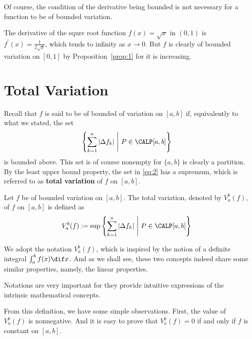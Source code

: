 \documentclass[thmcnt=section, color=blue, 12pt]{my-elegantbook}
\begin{document}
Of course, the condition of the derivative being bounded is not necessary
for a function to be of bounded variation.

\begin{example}
	The derivative of the squre root function $f(x) = \sqrt{x}$ in $(0, 1)$
	is $f^\prime(x) = \frac{1}{2\sqrt{x}}$,
	which tends to infinity as $x \to 0$.
	But $f$ is clearly of bounded variation on $[0, 1]$
	by Proposition~\ref{prop:1} for it is increasing.
\end{example}


\section{Total Variation}

Recall that $f$ is said to be of bounded of variation
on $[a, b]$ if, equivalently to what we stated, the set
\begin{align}
	\set{\sum_{k=1}^n \abs{\Delta f_k}}{P \in \CALP [a, b]}
	\label{eq:2}
\end{align}
is bounded above.
This set is of course nonempty for $\{a, b\}$ is clearly a partition.
By the least upper bound property,
the set in \eqref{eq:2} has a supremum, which is referred to as
\textbf{total variation} of $f$ on $[a, b]$.

\begin{definition}
	Let $f$ be of bounded variation on $[a, b]$.
	The total variation, denoted by $V_a^b (f)$,
	of $f$ on $[a, b]$ is defined as
	\begin{align*}
		V_a^b (f) := \sup \set{\sum_{k=1}^n \abs{\Delta f_k}}{P \in \CALP [a, b]}
	\end{align*}
\end{definition}

\begin{note}
	We adopt the notation $V_a^b(f)$,
	which is inspired by the notion of
	a definite integral $\int_a^b f(x) \dif x$.
	And as we shall see,
	these two concepts indeed share some similar properties, namely,
	the linear properties.

	Notations are very important for they provide intuitive expressions
	of the intrinsic mathematical concepts.
\end{note}

From this definition,
we have some simple observations.
First, the value of $V_a^b (f)$ is nonnegative.
And it is easy to prove that $V_a^b (f) = 0$
if and only if $f$ is constant on $[a, b]$.
\end{document}
